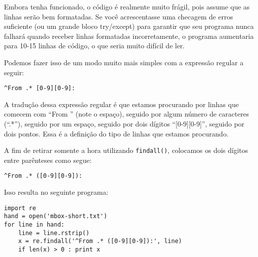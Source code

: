 
Embora tenha funcionado, o código é realmente muito frágil, pois assume que
as linhas serão bem formatadas. Se você acrescentasse uma checagem de erros
suficiente (ou um grande bloco try/except) para garantir que seu programa
nunca falhará quando receber linhas formatadas incorretamente, o programa
aumentaria para 10-15 linhas de código, o que seria muito difícil de ler.

Podemos fazer isso de um modo muito mais simples com a expressão regular a seguir:

\beforeverb
\begin{verbatim}
^From .* [0-9][0-9]:
\end{verbatim}
\afterverb
%

A tradução dessa expressão regular é que estamos procurando por linhas que
comecem com ``From '' (note o espaço), seguido por algum número de caracteres
(``.*''), seguido por um espaço, seguido por dois dígitos ``[0-9][0-9]'',
seguido por dois pontos. Essa é a definição do tipo de linhas que estamos 
procurando.

A fim de retirar somente a hora utilizando {\tt findall()}, colocamos os dois
dígitos entre parênteses como segue:

\beforeverb
\begin{verbatim}
^From .* ([0-9][0-9]):
\end{verbatim}
\afterverb
%

Isso resulta no seguinte programa:

\beforeverb
\begin{verbatim}
import re
hand = open('mbox-short.txt')
for line in hand:
    line = line.rstrip()
    x = re.findall('^From .* ([0-9][0-9]):', line)
    if len(x) > 0 : print x
\end{verbatim}
\afterverb
%

